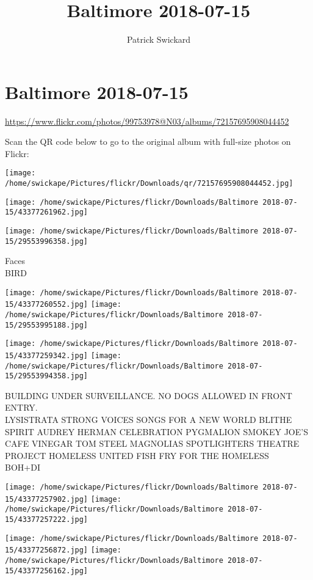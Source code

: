 \documentclass[10pt,letterpaper]{article}
\title{Baltimore 2018-07-15}
\author{Patrick Swickard}
\date{}
\begin{document}
\section*{Baltimore 2018-07-15}

\url{https://www.flickr.com/photos/99753978@N03/albums/72157695908044452}

Scan the QR code below to go to the original album with full-size photos on Flickr:

\texttt{[image: /home/swickape/Pictures/flickr/Downloads/qr/72157695908044452.jpg]}
\pagebreak

\texttt{[image: /home/swickape/Pictures/flickr/Downloads/Baltimore 2018-07-15/43377261962.jpg]}

\vspace{0.25in}
\texttt{[image: /home/swickape/Pictures/flickr/Downloads/Baltimore 2018-07-15/29553996358.jpg]}

Faces\\
BIRD
\pagebreak

\texttt{[image: /home/swickape/Pictures/flickr/Downloads/Baltimore 2018-07-15/43377260552.jpg]}
\texttt{[image: /home/swickape/Pictures/flickr/Downloads/Baltimore 2018-07-15/29553995188.jpg]}

\texttt{[image: /home/swickape/Pictures/flickr/Downloads/Baltimore 2018-07-15/43377259342.jpg]}
\texttt{[image: /home/swickape/Pictures/flickr/Downloads/Baltimore 2018-07-15/29553994358.jpg]}

BUILDING UNDER SURVEILLANCE.  NO DOGS ALLOWED IN FRONT ENTRY.\\
LYSISTRATA STRONG VOICES SONGS FOR A NEW WORLD BLITHE SPIRIT AUDREY HERMAN CELEBRATION PYGMALION SMOKEY JOE'S CAFE VINEGAR TOM STEEL MAGNOLIAS SPOTLIGHTERS THEATRE\\
PROJECT HOMELESS UNITED FISH FRY FOR THE HOMELESS\\
BOH+DI
\pagebreak

\texttt{[image: /home/swickape/Pictures/flickr/Downloads/Baltimore 2018-07-15/43377257902.jpg]}
\texttt{[image: /home/swickape/Pictures/flickr/Downloads/Baltimore 2018-07-15/43377257222.jpg]}

\texttt{[image: /home/swickape/Pictures/flickr/Downloads/Baltimore 2018-07-15/43377256872.jpg]}
\texttt{[image: /home/swickape/Pictures/flickr/Downloads/Baltimore 2018-07-15/43377256162.jpg]}
\end{document}
